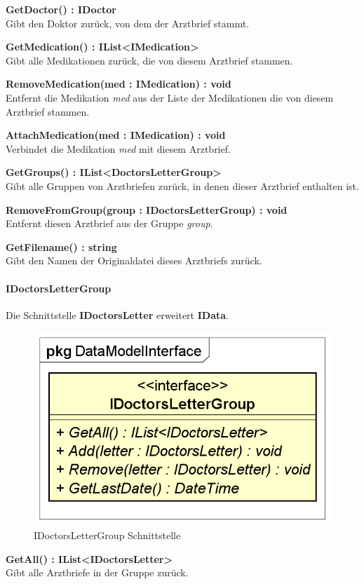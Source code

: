 \documentclass[a4paper]{scrreprt}
\begin{document}
\textbf{GetDoctor() : IDoctor}\\
Gibt den Doktor zurück, von dem der Arztbrief stammt.

\textbf{GetMedication() : IList<IMedication>}\\
Gibt alle Medikationen zurück, die von diesem Arztbrief stammen.

\textbf{RemoveMedication(med : IMedication) : void}\\
Entfernt die Medikation \textit{med} aus der Liste der Medikationen die von diesem Arztbrief stammen.

\textbf{AttachMedication(med : IMedication) : void}\\
Verbindet die Medikation \textit{med} mit diesem Arztbrief.

\textbf{GetGroups() : IList<DoctorsLetterGroup>}\\
Gibt alle Gruppen von Arztbriefen zurück, in denen dieser Arztbrief enthalten ist.

\textbf{RemoveFromGroup(group : IDoctorsLetterGroup) : void}\\
Entfernt diesen Arztbrief aus der Gruppe \textit{group}.

\textbf{GetFilename() : string}\\
Gibt den Namen der Originaldatei dieses Arztbriefs zurück.

\paragraph{IDoctorsLetterGroup}
Die Schnittstelle \textbf{IDoctorsLetter} erweitert \textbf{IData}.

\begin{figure}[H]
\centering
\includegraphics[width=0.45\textheight]{graphics/Klassendiagramme/Model/IDoctorsLetterGroup.png}
\caption{IDoctorsLetterGroup Schnittstelle}
\end{figure}
\textbf{GetAll() : IList<IDoctorsLetter>}\\
Gibt alle Arztbriefe in der Gruppe zurück.
\end{document}
